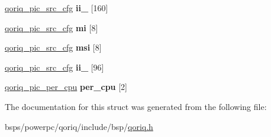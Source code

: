 \begin{DoxyCompactItemize}
\mbox{\label{structqoriq__pic_acb3b024f55034662a3cb1c376c4e0023}} 
\mbox{\hyperlink{structqoriq__pic__src__cfg}{qoriq\+\_\+pic\+\_\+src\+\_\+cfg}} {\bfseries ii\+\_} \mbox{[}160\mbox{]}
\item 
\mbox{\label{structqoriq__pic_a89f33c80edbd12b5e32c2cf383bb0b96}} 
\mbox{\hyperlink{structqoriq__pic__src__cfg}{qoriq\+\_\+pic\+\_\+src\+\_\+cfg}} {\bfseries mi} \mbox{[}8\mbox{]}
\item 
\mbox{\label{structqoriq__pic_a0edf7233f91d18867e9b5857b7491bdc}} 
\mbox{\hyperlink{structqoriq__pic__src__cfg}{qoriq\+\_\+pic\+\_\+src\+\_\+cfg}} {\bfseries msi} \mbox{[}8\mbox{]}
\item 
\mbox{\label{structqoriq__pic_a21e48dffa6742f1eb67e57a68b3b3b56}} 
\mbox{\hyperlink{structqoriq__pic__src__cfg}{qoriq\+\_\+pic\+\_\+src\+\_\+cfg}} {\bfseries ii\+\_} \mbox{[}96\mbox{]}
\item 
\mbox{\label{structqoriq__pic_ae130b4b3bd0dc20de3de40303b3adb22}} 
\mbox{\hyperlink{structqoriq__pic__per__cpu}{qoriq\+\_\+pic\+\_\+per\+\_\+cpu}} {\bfseries per\+\_\+cpu} \mbox{[}2\mbox{]}
\end{DoxyCompactItemize}


The documentation for this struct was generated from the following file\+:\begin{DoxyCompactItemize}
\item 
bsps/powerpc/qoriq/include/bsp/\mbox{\hyperlink{qoriq_8h}{qoriq.\+h}}\end{DoxyCompactItemize}
